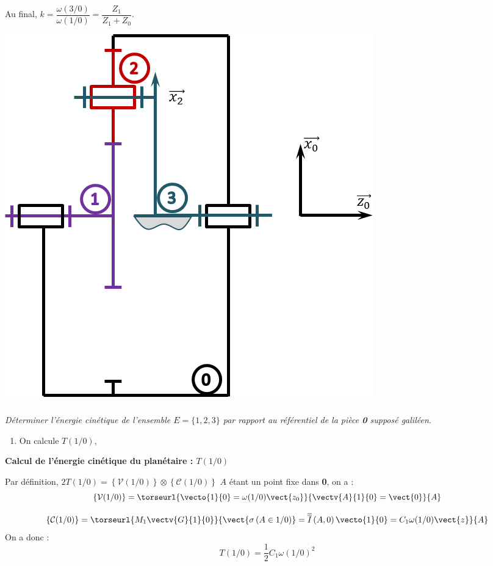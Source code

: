 \documentclass[10pt,fleqn]{article} %
\begin{document}
\begin{corrige}
\begin{minipage}[c]{.6\linewidth}
Au final, $k = \dfrac{\omega(3/0)}{\omega(1/0)} = \dfrac{Z_1}{Z_1+Z_0}$.
\end{minipage}\hfill
\begin{minipage}[c]{.35\linewidth}
\begin{center}
\includegraphics[width=\textwidth]{images/train_02}
\end{center}

\end{minipage}
\end{corrige}
\else
\fi

\subparagraph{}
\textit{Déterminer l'énergie cinétique de l'ensemble $E=\{1,2,3\}$ par rapport au référentiel de la pièce \textbf{0} supposé galiléen.}
\ifprof
\begin{corrige}
\begin{methode}
\begin{enumerate}
\item On calcule $T(1/0)$, 
\end{enumerate}
\end{methode}
\textbf{Calcul de l'énergie cinétique du planétaire : $T(1/0)$}

Par définition, 
$2T(1/0)=\left\{\mathcal{V}(1/0) \right\} \otimes \left\{\mathcal{C}(1/0) \right\} $
$A$ étant un point fixe dans \textbf{0}, on a : 
$$
\left\{\mathcal{V}(1/0) \right\} = \torseurl{\vecto{1}{0}=\omega(1/0)\vect{z_0}}{\vectv{A}{1}{0}=\vect{0}}{A}$$

$$
\left\{\mathcal{C}(1/0) \right\} 
= \torseurl{M_1\vectv{G}{1}{0}}{\vect{\sigma \left( A\in 1/0\right)}=\overline{\overline{I}}\left( A,0\right) \vecto{1}{0}=C_1\omega(1/0)\vect{z}}{A}
$$
On a donc : 
$$T(1/0)=\dfrac{1}{2} C_1 \omega(1/0)^2 $$

\end{corrige}
\end{document}

